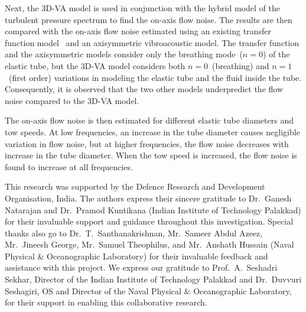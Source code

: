 \documentclass[11pt,cleanfoot]{asme2ej}
\begin{document}
Next, the 3D-VA model is used in conjunction with the hybrid model of the turbulent pressure spectrum to find the on-axis flow noise. The results are then compared with the on-axis flow noise estimated using an existing transfer function model~\cite{knight1996} and an axisymmetric vibroacoustic model. The transfer function and the axisymmetric models consider only the breathing mode~($n=0$) of the elastic tube, but the 3D-VA model considers both $n=0$~(breathing) and $n=1$~(first order) variations in modeling the elastic tube and the fluid inside the tube. Consequently, it is observed that the two other models underpredict the flow noise compared to the 3D-VA model.

The on-axis flow noise is then estimated for different elastic tube diameters and tow speeds. At low frequencies, an increase in the tube diameter causes negligible variation in flow noise, but at higher frequencies, the flow noise decreases with increase in the tube diameter. When the tow speed is increased, the flow noise is found to increase at all frequencies.




\begin{acknowledgment}
This research was supported by the Defence Research and Development Organisation, India. The authors express their sincere gratitude to Dr.~Ganesh Natarajan and Dr.~Pramod Kuntikana (Indian Institute of Technology Palakkad) for their invaluable support and guidance throughout this investigation. Special thanks also go to Dr.~T.~Santhanakrishnan, Mr.~Sameer Abdul Azeez, Mr.~Jineesh George, Mr.~Samuel Theophilus, and Mr.~Anshath Hussain (Naval Physical \& Oceanographic Laboratory) for their invaluable feedback and assistance with this project. We express our gratitude to Prof.~A.~Seshadri Sekhar, Director of the Indian Institute of Technology Palakkad and Dr.~Duvvuri Seshagiri, OS and Director of the Naval Physical \& Oceanographic Laboratory, for their support in enabling this collaborative research.
\end{acknowledgment}

%
\end{document}
